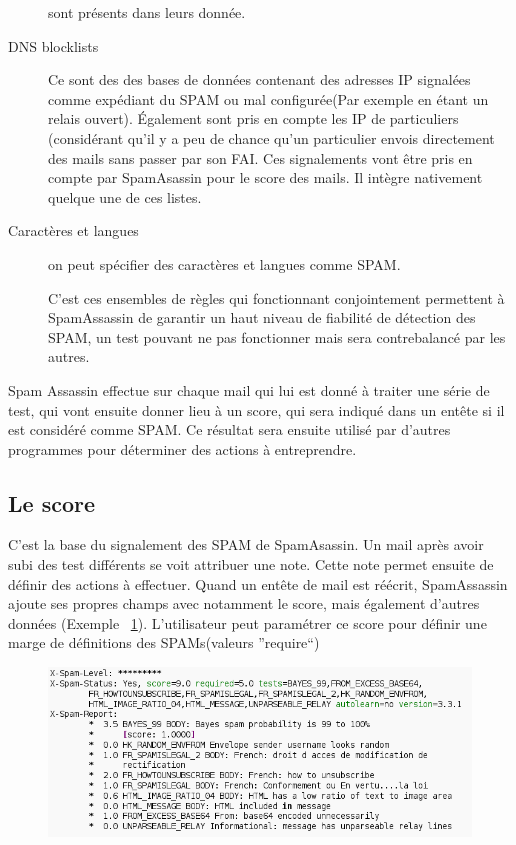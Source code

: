 \documentclass[a4paper,11pt]{article}
\begin{document}
\begin{description}
 sont présents dans leurs donnée.
 \item [DNS blocklists] Ce sont des des bases de données contenant des adresses IP signalées comme expédiant du SPAM ou mal 
 configurée(Par exemple en étant un relais ouvert). Également sont pris en compte les IP de particuliers (considérant qu'il y a peu de chance
qu'un particulier envois directement des mails sans passer par son FAI. Ces signalements vont être pris en compte par SpamAsassin pour le score des mails.
Il intègre nativement quelque une de ces listes.
\item [Caractères et langues] on peut spécifier des caractères et langues comme SPAM.

C'est ces ensembles de règles qui fonctionnant conjointement permettent à SpamAssassin de garantir un haut 
niveau de fiabilité de détection des SPAM, un test pouvant ne pas fonctionner mais sera contrebalancé par les autres.
 \end{description} 


Spam Assassin effectue sur chaque mail qui lui est donné à traiter une série de test, qui vont ensuite donner lieu à un score, qui sera indiqué dans un entête si il est considéré comme SPAM. 
Ce résultat sera ensuite utilisé par d'autres programmes pour déterminer des actions à entreprendre.


\subsection{Le score} \label{score}
C'est la base du signalement des SPAM de SpamAsassin. Un mail après avoir subi des test différents se voit attribuer une note. Cette note permet
ensuite de définir des actions à effectuer. Quand un entête de mail est réécrit, SpamAssassin ajoute ses propres champs avec
notamment le score, mais également d'autres données (Exemple ~\ref{fig:ex_score}). L'utilisateur peut paramétrer ce 
score pour définir une marge de définitions des SPAMs(valeurs ''require``)

\begin{figure}[b]
 \includegraphics[width=\textwidth]{annexes/entete.png}
 \label{fig:ex_score}
\end{figure}
\end{document}

